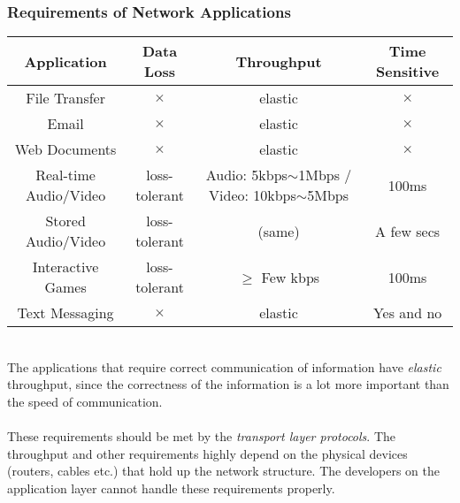 \subsubsection{Requirements of Network Applications}
\begin{center}
\begin{tabular}{c|c|c|c}
	\textbf{Application} & \textbf{Data Loss} & \textbf{Throughput} & \textbf{Time Sensitive} \\ \hline
	File Transfer & $\times$ & elastic & $\times$\\
	Email & $\times$ & elastic & $\times$\\
	Web Documents & $\times$ & elastic & $\times$\\
	Real-time Audio/Video & loss-tolerant & Audio: 5kbps$\sim$1Mbps / Video: 10kbps$\sim$5Mbps& 100ms\\
	Stored Audio/Video & loss-tolerant & (same) & A few secs\\
	Interactive Games & loss-tolerant & $\geq$ Few kbps & 100ms\\
	Text Messaging & $\times$ & elastic & Yes and no\\\hline
\end{tabular}
\end{center}~\\
The applications that require correct communication of information have \textit{elastic} throughput, since the correctness of the information is a lot more important than the speed of communication.\\
\\
These requirements should be met by the \textit{transport layer protocols}. The throughput and other requirements highly depend on the physical devices (routers, cables etc.) that hold up the network structure. The developers on the application layer cannot handle these requirements properly.

